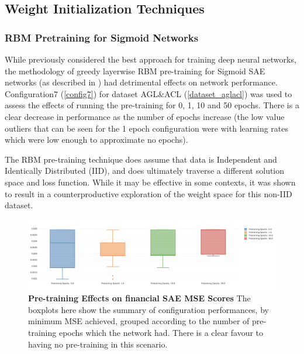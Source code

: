 \documentclass[a4paper,latin]{paper}
\begin{document}
\subsection{Weight Initialization Techniques}

\subsubsection{RBM Pretraining for Sigmoid Networks}

While previously considered the best approach for training deep neural networks, the methodology of greedy layerwise RBM pre-training for Sigmoid SAE networks (as described in \cite{Hinton2}) had detrimental effects on network performance. Configuration7 (\ref{config7}) for dataset AGL\&ACL (\ref{dataset_aglacl}) was used to assess the effects of running the pre-training for 0, 1, 10 and 50 epochs. There is a clear decrease in performance as the number of epochs increase (the low value outliers that can be seen for the 1 epoch configuration were with learning rates which were low enough to approximate no epochs). \newline

The RBM pre-training technique does assume that data is Independent and Identically Distributed (IID), and does ultimately traverse a different solution space and loss function. While it may be effective in some contexts, it was shown to result in a counterproductive exploration of the weight space for this non-IID dataset. 


\begin{figure}[H]
	\centering \includegraphics[scale=0.3]{images/iteration_two/pt/SAE_Pre-training_epochs_Min_Test_MSE.png}
	\caption{\textbf{Pre-training Effects on financial SAE MSE Scores} \newline The boxplots here show the summary of configuration performances, by minimum MSE achieved, grouped according to the number of pre-training epochs which the network had. There is a clear favour to having no pre-training in this scenario.}
	\label{figure-results-pretraining-effect}
\end{figure}		
\end{document}
